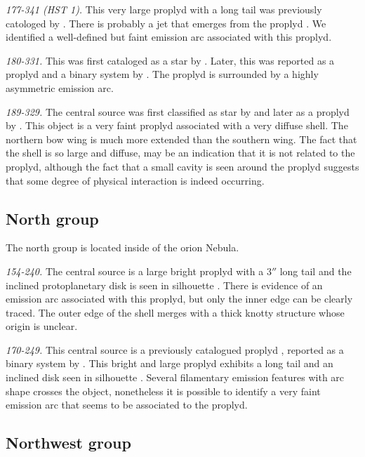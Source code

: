 \documentclass[apj, twocolumn]{aastex63}
\renewcommand\clearpage{}
\begin{document}
\textit{177-341 (HST 1).} This very large proplyd with a long tail was
previously catologed by \citet{ODell:1994a, Ricci:2008a}. There is
probably a jet that emerges from the proplyd \citep{Bally:2000a}.
We identified a well-defined but faint  emission arc associated with
this proplyd.

\textit{180-331.} This was first cataloged as a star by
\citet{ODell:1996a}. Later, this was reported as a proplyd and a
binary system by \citet{Ricci:2008a}. The proplyd is surrounded by
a highly asymmetric emission arc.

\textit{189-329.}  The central source was first classified as star
by \citet{ODell:1996a} and later as a proplyd by \citet{Ricci:2008a}.
This object is a very faint proplyd associated with a very diffuse
shell. The northern bow wing is much more extended than the southern
wing. The fact that the shell is so large and diffuse, may be an
indication that it is not related to the proplyd, although the fact
that a small cavity is seen  around the proplyd suggests that some
degree of physical interaction is indeed occurring.


\clearpage
\subsection{North group}
\label{sec:n-group}



The north group is located inside of the orion Nebula.


\textit{154-240.} The central source is a large bright
proplyd \cite{Bally:2000a, Ricci:2008a} with a \(3''\)
long tail and the inclined protoplanetary disk is seen
in silhouette \citep{Bally:2000a}. There is evidence of
an emission arc associated with this proplyd, but only
the inner edge can be clearly traced. The outer edge of
the shell merges with a thick knotty structure whose origin
is unclear.

\textit{170-249.} This central source is a previously
catalogued proplyd \citep{ODell:1996a}, reported as a
binary system by \citet{Ricci:2008a}. This bright and
large proplyd exhibits a long tail and an inclined disk
seen in silhouette \citep{Bally:2000a}. Several
filamentary emission features with arc shape crosses the
object, nonetheless it is possible to identify a very faint
emission arc that seems to be associated to the proplyd.  


\clearpage
\subsection{Northwest group}
\label{sec:nw-group}


\end{document}
